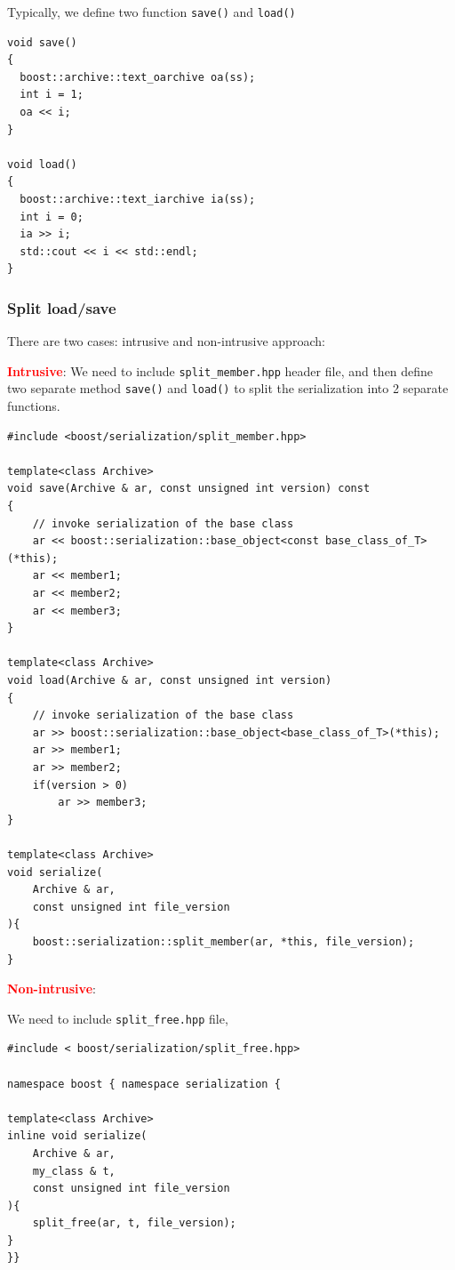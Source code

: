 Typically, we define two function \verb!save()! and \verb!load()!
\begin{verbatim}
void save() 
{ 
  boost::archive::text_oarchive oa(ss); 
  int i = 1; 
  oa << i; 
} 

void load() 
{ 
  boost::archive::text_iarchive ia(ss); 
  int i = 0; 
  ia >> i; 
  std::cout << i << std::endl; 
} 
\end{verbatim}

\subsubsection{Split load/save}

There are two cases: intrusive and non-intrusive approach:

\textcolor{red}{\bf Intrusive}: We need to include \verb!split_member.hpp!
header file, and then define two separate method \verb!save()! and \verb!load()!
to split the serialization into 2 separate functions.

\begin{verbatim}
#include <boost/serialization/split_member.hpp>
 
template<class Archive>
void save(Archive & ar, const unsigned int version) const
{
    // invoke serialization of the base class 
    ar << boost::serialization::base_object<const base_class_of_T>(*this);
    ar << member1;
    ar << member2;
    ar << member3;
}

template<class Archive>
void load(Archive & ar, const unsigned int version)
{
    // invoke serialization of the base class 
    ar >> boost::serialization::base_object<base_class_of_T>(*this);
    ar >> member1;
    ar >> member2;
    if(version > 0)
        ar >> member3;
}

template<class Archive>
void serialize(
    Archive & ar,
    const unsigned int file_version 
){
    boost::serialization::split_member(ar, *this, file_version);
}
\end{verbatim}

\textcolor{red}{\bf Non-intrusive}: 

We need to include \verb!split_free.hpp! file,
\begin{verbatim}
#include < boost/serialization/split_free.hpp>

namespace boost { namespace serialization {

template<class Archive>
inline void serialize(
    Archive & ar,
    my_class & t,
    const unsigned int file_version
){
    split_free(ar, t, file_version); 
}
}}

\end{verbatim}

